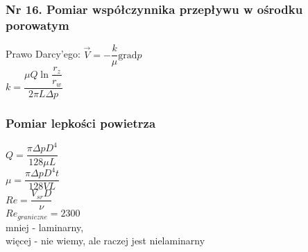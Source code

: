 \documentclass[a4paper,12pt]{article}
\begin{document}
\subsubsection{Nr 16. Pomiar współczynnika przepływu w ośrodku porowatym}
	Prawo Darcy'ego: $\vec{V}=-\dfrac{k}{\mu} \mathrm{grad}p$\\
	$k=\dfrac{\mu Q \ln{\dfrac{r_z}{r_w}}}{2\pi L \Delta p}$\\
\subsubsection{Pomiar lepkości powietrza}
	$Q=\dfrac{\pi \Delta p D^4}{128 \mu L}$\\
	$\mu=\dfrac{\pi \Delta p D^4 t}{128 VL}$\\
	$Re=\dfrac{V_{sr}D}{\nu}$\\
	$Re_{graniczne}=2300$\\
	mniej - laminarny,\\
	więcej - nie wiemy, ale raczej jest nielaminarny\\
\end{document}
